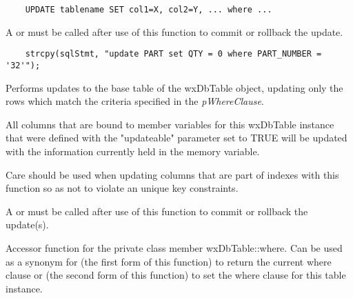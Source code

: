 \begin{verbatim}
    UPDATE tablename SET col1=X, col2=Y, ... where ...
\end{verbatim}




A  or 
 must be called after use of 
this function to commit or rollback the update.


\begin{verbatim}
    strcpy(sqlStmt, "update PART set QTY = 0 where PART_NUMBER = '32'");
\end{verbatim}


\label{wxdbtableupdatewhere}


Performs updates to the base table of the wxDbTable object, updating only the 
rows which match the criteria specified in the {\it pWhereClause}.

All columns that are bound to member variables for this wxDbTable instance 
that were defined with the "updateable" parameter set to TRUE will be updated 
with the information currently held in the memory variable.  




Care should be used when updating columns that are part of indexes with 
this function so as not to violate an unique key constraints.

A  or 
 must be called after use of 
this function to commit or rollback the update(s).


\label{wxdbtablewhere}



Accessor function for the private class member wxDbTable::where.  Can be used 
as a synonym for  
(the first form of this function) to return the current where clause or  
 (the second form 
of this function) to set the where clause for this table instance.

